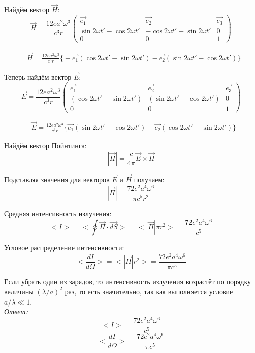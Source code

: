 Найдём вектор \( \vec{H} \):
\[ 
	\vec{H} = \frac{12ea^2\omega^3}{c^3r}
	\left(
	\begin{array}{ccc}
		\vec{e_1} & \vec{e_2} & \vec{e_3} \\
		\sin{2\omega t'} - \cos{2\omega t'} & 
		-\cos{2\omega t'} - \sin{2\omega t'} & 0 \\
		0 & 0 & 1
	\end{array}
	\right)
\]

\begin{align*}
	& \vec{H} = \frac{12ea^2\omega^3}{c^3r} \Big\{
		-\vec{e_1}\left( \cos{2\omega t'} - \sin{2\omega t'} \right)
		-\vec{e_2}\left( \sin{2\omega t'} - \cos{2\omega t'} \right)
	\Big\}
\end{align*}

Теперь найдём вектор \( \vec{E} \):
\[ 
	\vec{E} = \frac{12ea^2\omega^3}{c^3r}
	\left(
	\begin{array}{ccc}
		\vec{e_1} & \vec{e_2} & \vec{e_3} \\
		\left( \cos{2\omega t'} - \sin{2\omega t'} \right) & 
		\left( \sin{2\omega t'} - \cos{2\omega t'} \right) & 0 \\
		0 & 0 & 1
	\end{array}
	\right)
\]

\begin{align*}
	& \vec{E} = \frac{12ea^2\omega^3}{c^3r} \Big\{
		\vec{e_1}\left( \sin{2\omega t'} - \cos{2\omega t'} \right)
		-\vec{e_2}\left( \cos{2\omega t'} - \sin{2\omega t'} \right)
	\Big\}
\end{align*}

Найдём вектор Пойнтинга:
\[ |\vec{\Pi}| = \frac{c}{4\pi}\vec{E}\times\vec{H} \]

Подставляя значения для векторов \( \vec{E} \) и \( \vec{H} \) получаем:
\[ |\vec{\Pi}| = \frac{72e^2a^4\omega^6}{\pi c^5 r^2} \]

Средняя интенсивность излучения:
\[ 
	<I> = < \oint \vec{\Pi}\cdot\vec{dS} > = 
	<|\vec{\Pi}|\pi r^2> = \frac{72e^2a^4\omega^6}{c^5}
\]

Угловое распределение интенсивности:
\[ 
	<\frac{dI}{d\Omega}> = <|\vec{\Pi}|r^2> = 
	\frac{72e^2a^4\omega^6}{\pi c^5} 
\]

Если убрать один из зарядов, то интенсивность излучения возрастёт по порядку 
величины \( (\lambda/a)^2 \) раз, то есть значительно, так как выполняется 
условие \( a/\lambda \ll 1 \).\\

\emph{Ответ:}
\[ <I> = \frac{72e^2a^4\omega^6}{c^5} \]
\[ <\frac{dI}{d\Omega}> = \frac{72e^2a^4\omega^6}{\pi c^5} \]

